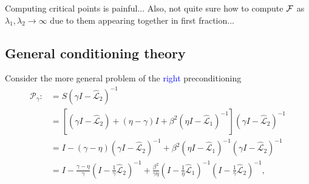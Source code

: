 \documentclass[a4paper,10pt]{article}
\newcommand{\tcb}{\textcolor{blue}}
\begin{document}
{Computing critical points is painful... Also, not quite sure how to compute ${\cal F}$ as $\lambda_1, \lambda_2 \to \infty$ due to them appearing together in first fraction...

\subsection{General conditioning theory}

Consider the more general problem of the \tcb{right} preconditioning 
%
\begin{align}\nonumber
\mathcal{P}_\gamma :&=
S(\gamma I- \widehat{\mathcal{L}}_2)^{-1} \\
& = \left[ (\gamma I - \widehat{\mathcal{L}}_2) + (\eta-\gamma)I +
	\beta^2 (\eta I - \widehat{\mathcal{L}}_1)^{-1}\right]
	(\gamma I - \widehat{\mathcal{L}}_2)^{-1} \\
& = I - (\gamma - \eta)( \gamma I- \widehat{\mathcal{L}}_2)^{-1} + 
	\beta^2( \eta I-\widehat{\mathcal{L}}_1)^{-1}
	( \gamma I- \widehat{\mathcal{L}}_2)^{-1}\nonumber\\
& = I - \frac{\gamma - \eta}{\gamma} ( I- \tfrac{1}{\gamma}\widehat{\mathcal{L}}_2)^{-1} + 
	\frac{\beta^2}{\gamma\eta}( I- \tfrac{1}{\eta}\widehat{\mathcal{L}}_1)^{-1}
	( I- \tfrac{1}{\gamma}\widehat{\mathcal{L}}_2)^{-1},\label{eq:gamma2}
\end{align}




}
\end{document}
